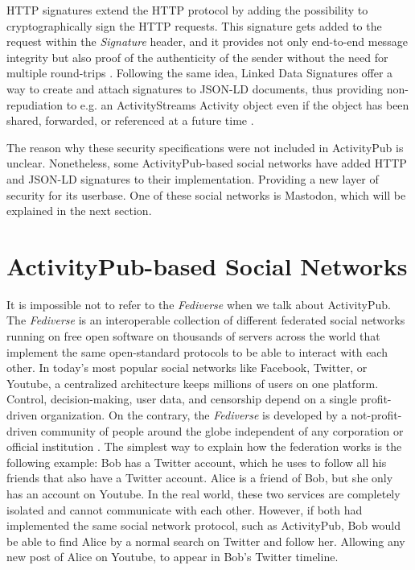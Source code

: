 HTTP signatures extend the HTTP protocol by adding the possibility to cryptographically sign the HTTP requests. This signature gets added to the request within the \emph{Signature} header, and it provides not only end-to-end message integrity but also proof of the authenticity of the sender without the need for multiple round-trips \cite{cavage_sporny_2019}. Following the same idea, Linked Data Signatures offer a way to create and attach signatures to JSON-LD documents, thus providing non-repudiation to e.g. an ActivityStreams Activity object even if the object has been shared, forwarded, or referenced at a future time \cite{celik_prodromou_le_hors_2014}.

The reason why these security specifications were not included in ActivityPub is unclear. Nonetheless, some ActivityPub-based social networks have added HTTP and JSON-LD signatures to their implementation. Providing a new layer of security for its userbase. One of these social networks is Mastodon, which will be explained in the next section.


\section{ActivityPub-based Social Networks}

It is impossible not to refer to the \emph{Fediverse} when we talk about ActivityPub. The \emph{Fediverse} is an interoperable collection of different federated social networks running on free open software on thousands of servers across the world that implement the same open-standard protocols to be able to interact with each other. In today's most popular social networks like Facebook, Twitter, or Youtube, a centralized architecture keeps millions of users on one platform. Control, decision-making, user data, and censorship depend on a single profit-driven organization. On the contrary, the \emph{Fediverse} is developed by a not-profit-driven community of people around the globe independent of any corporation or official institution \cite{holloway_2018} \cite{https://doi.org/10.48550/arxiv.1909.05801}. The simplest way to explain how the federation works is the following example: Bob has a Twitter account, which he uses to follow all his friends that also have a Twitter account. Alice is a friend of Bob, but she only has an account on Youtube. In the real world, these two services are completely isolated and cannot communicate with each other. However, if both had implemented the same social network protocol, such as ActivityPub, Bob would be able to find Alice by a normal search on Twitter and follow her. Allowing any new post of Alice on Youtube, to appear in Bob's Twitter timeline.

